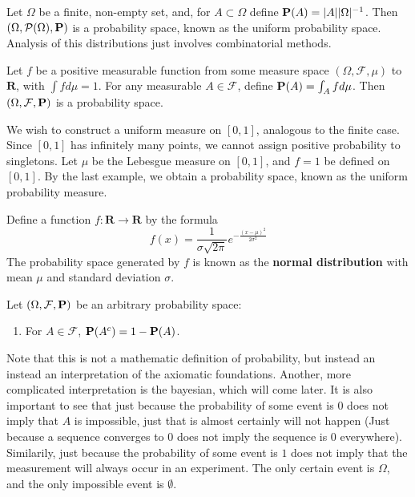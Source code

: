 \begin{example}
    Let $\Omega$ be a finite, non-empty set, and, for $A \subset \Omega$ define $\operatorname{\mathbf{P}}(A) = |A| |\Omega|^{-1}$. Then $(\Omega, \mathcal{P}(\Omega), \operatorname{\mathbf{P}})$ is a probability space, known as the uniform probability space. Analysis of this distributions just involves combinatorial methods.
\end{example}

\begin{example}
    Let $f$ be a positive measurable function from some measure space $(\Omega,\mathcal{F}, \mu)$ to $\mathbf{R}$, with $\int f d\mu = 1$. For any measurable $A \in \mathcal{F}$, define $\operatorname{\mathbf{P}}(A) = \int_A f d\mu$. Then $(\Omega, \mathcal{F}, \operatorname{\mathbf{P}})$ is a probability space.
\end{example}

\begin{example}
    We wish to construct a uniform measure on $[0,1]$, analogous to the finite case. Since $[0,1]$ has infinitely many points, we cannot assign positive probability to singletons. Let $\mu$ be the Lebesgue measure on $[0,1]$, and $f = 1$ be defined on $[0,1]$. By the last example, we obtain a probability space, known as the uniform probability measure.
\end{example}

\begin{example}
    Define a function $f:\mathbf{R} \to \mathbf{R}$ by the formula
    \[ f(x) = \frac{1}{\sigma \sqrt{2\pi}} e^{-\frac{(x - \mu)^2}{2\sigma^2}} \]
    The probability space generated by $f$ is known as the {\bf normal distribution} with mean $\mu$ and standard deviation $\sigma$.
\end{example}

\begin{theorem}
    Let $(\Omega, \mathcal{F}, \operatorname{\mathbf{P}})$ be an arbitrary probability space:
    \begin{enumerate}
        \item For $A \in \mathcal{F}$, $\operatorname{\mathbf{P}}(A^c) = 1 - \operatorname{\mathbf{P}}(A)$.
    \end{enumerate}
\end{theorem}

Note that this is not a mathematic definition of probability, but instead an instead an interpretation of the axiomatic foundations. Another, more complicated interpretation is the bayesian, which will come later. It is also important to see that just because the probability of some event is $0$ does not imply that $A$ is impossible, just that is almost certainly will not happen (Just because a sequence converges to $0$ does not imply the sequence is $0$ everywhere). Similarily, just because the probability of some event is $1$ does not imply that the measurement will always occur in an experiment. The only certain event is $\Omega$, and the only impossible event is $\emptyset$.

